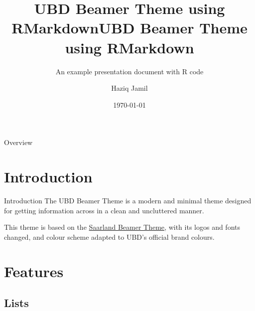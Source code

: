 \documentclass[,aspectratio=43]{beamer}
\author{Haziq Jamil}
\title{UBD Beamer Theme using RMarkdown}
\title{UBD Beamer Theme using RMarkdown}
\subtitle{An example presentation document with R code}
\institute{Mathematical Sciences, Faculty of Science, UBD\\
\url{https://haziqj.ml}}
\date{\today}
\begin{document}
\begin{frame}
	\titlepage
\end{frame}

\begin{frame}{Overview}
    \tableofcontents
  \end{frame}

\hypertarget{introduction}{%
\section{Introduction}\label{introduction}}

\begin{frame}{Introduction}
The UBD Beamer Theme is a modern and minimal theme designed for getting
information across in a clean and uncluttered manner. \bigskip

This theme is based on the
\href{https://github.com/kailashbuki/beamerthemesaarland}{Saarland
Beamer Theme}, with its logos and fonts changed, and colour scheme
adapted to UBD's official brand colours.
\end{frame}

\hypertarget{features}{%
\section{Features}\label{features}}

\hypertarget{lists}{%
\subsection{Lists}\label{lists}}
\end{document}
